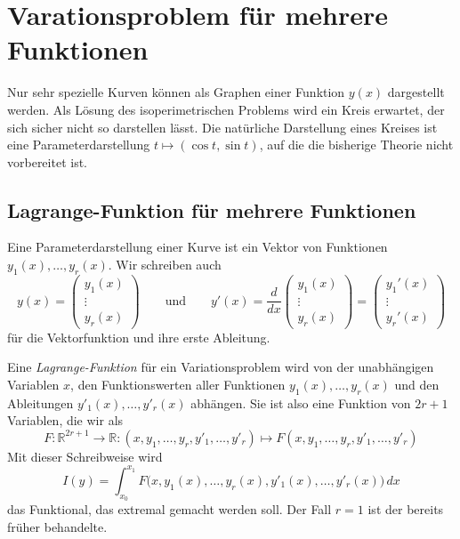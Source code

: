 %
%
%
\section{Varationsproblem für mehrere Funktionen
\label{buch:variation:section:mehrerefunktionen}}
Nur sehr spezielle Kurven können als Graphen einer Funktion $y(x)$
dargestellt werden.
Als Lösung des isoperimetrischen Problems wird ein Kreis erwartet,
der sich sicher nicht so darstellen lässt.
Die natürliche Darstellung eines Kreises ist eine Parameterdarstellung
$t\mapsto(\cos t,\sin t)$, auf die die bisherige Theorie nicht
vorbereitet ist.

%
%
\subsection{Lagrange-Funktion für mehrere Funktionen
\label{buch:variation:mehrerefunction:subsection:lagrangefunktion}}
Eine Parameterdarstellung einer Kurve ist ein Vektor von Funktionen
$y_1(x),\dots,y_r(x)$.
Wir schreiben auch
\[
y(x)
=
\begin{pmatrix}
y_1(x)\\
\vdots\\
y_r(x)
\end{pmatrix}
\qquad\text{und}\qquad
y'(x)
=
\frac{d}{dx}
\begin{pmatrix}
y_1(x)\\
\vdots\\
y_r(x)
\end{pmatrix}
=
\begin{pmatrix}
y_1'(x)\\
\vdots\\
y_r'(x)
\end{pmatrix}
\]
für die Vektorfunktion und ihre erste Ableitung.

Eine {\em Lagrange-Funktion} für ein Variationsproblem wird von
der unabhängigen Variablen $x$, den Funktionswerten aller Funktionen
$y_1(x),\dots,y_r(x)$ und den Ableitungen $y'_1(x),\dots,y'_r(x)$
abhängen.
Sie ist also eine Funktion von $2r+1$ Variablen, die wir als
\begin{equation*}
F
\colon
\mathbb{R}^{2r+1}\to\mathbb{R}
:
(x,y_1,\dots,y_r,y'_1,\dots,y'_r)\mapsto F(x,y_1,\dots,y_r,y'_1,\dots,y'_r)
\end{equation*}
Mit dieser Schreibweise wird
\[
I(y)
=
\int_{x_0}^{x_1}
F\bigl(x,y_1(x),\dots,y_r(x),y'_1(x),\dots,y'_r(x)\bigr)\,dx
\]
das Funktional, das extremal gemacht werden soll.
Der Fall $r=1$ ist der bereits früher behandelte.

